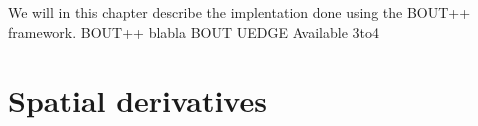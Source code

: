 We will in this chapter describe the implentation done using the BOUT++ framework.
BOUT++ blabla BOUT UEDGE
Available
3to4

\section{Spatial derivatives}
